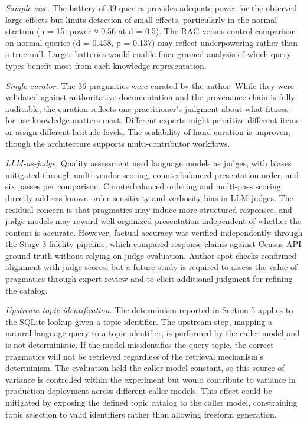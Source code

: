 \documentclass[
  11pt,
  letterpaper,
]{article}
\begin{document}
\emph{Sample size.} The battery of 39 queries provides adequate power
for the observed large effects but limits detection of small effects,
particularly in the normal stratum (n = 15, power ≈ 0.56 at d = 0.5).
The RAG versus control comparison on normal queries (d = 0.458, p =
0.137) may reflect underpowering rather than a true null. Larger
batteries would enable finer-grained analysis of which query types
benefit most from each knowledge representation.

\emph{Single curator.} The 36 pragmatics were curated by the author.
While they were validated against authoritative documentation and the
provenance chain is fully auditable, the curation reflects one
practitioner's judgment about what fitness-for-use knowledge matters
most. Different experts might prioritize different items or assign
different latitude levels. The scalability of hand curation is unproven,
though the architecture supports multi-contributor workflows.

\emph{LLM-as-judge.} Quality assessment used language models as judges,
with biases mitigated through multi-vendor scoring, counterbalanced
presentation order, and six passes per comparison. Counterbalanced
ordering and multi-pass scoring directly address known order sensitivity
and verbosity bias in LLM judges. The residual concern is that
pragmatics may induce more structured responses, and judge models may
reward well-organized presentation independent of whether the content is
accurate. However, factual accuracy was verified independently through
the Stage 3 fidelity pipeline, which compared response claims against
Census API ground truth without relying on judge evaluation. Author spot
checks confirmed alignment with judge scores, but a future study is
required to assess the value of pragmatics through expert review and to
elicit additional judgment for refining the catalog.

\emph{Upstream topic identification.} The determinism reported in
Section 5 applies to the SQLite lookup given a topic identifier. The
upstream step, mapping a natural-language query to a topic identifier,
is performed by the caller model and is not deterministic. If the model
misidentifies the query topic, the correct pragmatics will not be
retrieved regardless of the retrieval mechanism's determinism. The
evaluation held the caller model constant, so this source of variance is
controlled within the experiment but would contribute to variance in
production deployment across different caller models. This effect could
be mitigated by exposing the defined topic catalog to the caller model,
constraining topic selection to valid identifiers rather than allowing
freeform generation.
\end{document}

